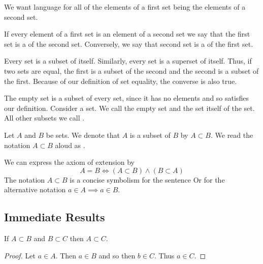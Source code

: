 

We want language for all of the elements of a first set being the elements of a second set.


If every element
of a first set is
an element of a
second set we say
that the first set
is a 
of the second set.
Conversely, we say that
second set is a
 of
the first set.

Every set is a subset of itself.
Similarly, every set is a
superset of itself.
Thus, if two sets are equal,
the first is a subset of the
second and the second is
a subset of the first.
Because of our definition
of set equality, the converse
is also true.

The empty set is a subset of every set,
since it has no elements and so satisfies
our definition.
Consider a set.
We call the empty set and the set itself
of the set.
All other subsets we call
.

Let $A$ and $B$ be sets.
We denote that $A$ is a subset of $B$ by $A \subset B$.
We read the notation $A \subset B$ aloud as .

We can express the axiom of extension by
\[
  A = B \Leftrightarrow (A \subset B) \land (B \subset A)
\]
The notation $A \subset B$
is a concise symbolism for
the sentence
 Or for the alternative notation
$a \in A \implies a \in B$.

\subsection{Immediate Results}

\begin{prop}
If $A \subset B$ and $B \subset C$ then $A \subset C$.
\begin{proof}
  Let $a \in A$. Then $a \in B$ and so then $b \in C$.
  Thus $a \in C$.
\end{proof}
\end{prop}
